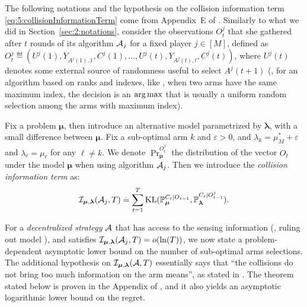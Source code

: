 The following notations and the hypothesis on the collision information term \eqref{eq:5:collisionInformationTerm} come from Appendix~E of \cite{KaufmannAbbas19}.
Similarly to what we did in Section~\ref{sec:2:notations},
consider the observations $O_t^j$ that she gathered after $t$ rounds of its algorithm $\mathcal{A}_j$ for a fixed player $j\in[M]$,
defined as $O_t^j \eqdef \left( U^j(1), Y_{A^j(1),1}, C^j(1), \ldots, U^j(t), Y_{A^j(t),t}, C^j(t) \right)$,
where $U^j(t)$ denotes some external source of randomness useful to select $A^j(t+1)$ (\eg, for an algorithm based on ranks and \UCB{} indexes, like \RhoRand, when two arms have the same maximum index, the decision is an $\operatorname*{arg\,max}$ that is usually a uniform random selection among the arms with maximum index).

Fix a problem $\bm{\mu}$,
then introduce an alternative model parametrized by $\bm{\lambda}$, with a small difference between $\bm{\mu}$.
Fix a sub-optimal arm $k$ and $\varepsilon>0$, and $\lambda_k = \mu^*_M + \varepsilon$ and $\lambda_{\ell} = \mu_{\ell}$ for any $\ell\neq k$.
We denote $\Pr_{\bm{\mu}}^{O_t^j}$ the distribution of the vector $O_t$ under the model $\bm{\mu}$ when using algorithm $\mathcal{A}_j$.
Then we introduce the \emph{collision information term} as:
\begin{equation}\label{eq:5:collisionInformationTerm}
  \mathcal{I}_{\bm{\mu},\bm{\lambda}}(\mathcal{A}_j,T) \overset{.}{=} \sum_{t=1}^{T} \mathrm{KL}(\mathbb{P}_{\bm{\mu}}^{C_t | O_{t-1}}, \mathbb{P}_{\bm{\lambda}}^{C_t | O_{t-1}^j}).
\end{equation}

For a \emph{decentralized strategy} $\mathcal{A}$ that has access to the sensing information (\ie, ruling out model \modeltrois), and satisfies $\mathcal{I}_{\bm{\mu},\bm{\lambda}}(\mathcal{A}_j,T) = \mathop{}\mathopen{}o\mathopen{}\left(\ln(T)\right)$,
we now state a problem-dependent asymptotic lower bound on the number of sub-optimal arms selections.
The additional hypothesis on $\mathcal{I}_{\bm{\mu},\bm{\lambda}}(\mathcal{A},T)$ essentially says that ``the collisions do not bring too much information on the arm means'', as stated in \cite{KaufmannAbbas19}.
The theorem stated below is proven in the Appendix of \cite{Besson2018ALT},
and it also yields an asymptotic logarithmic lower bound on the regret.

